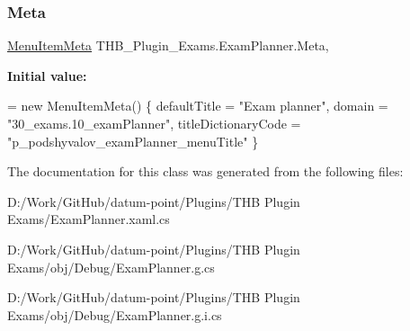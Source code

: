 \subsubsection{\texorpdfstring{Meta}{Meta}}
{\footnotesize\ttfamily \mbox{\hyperlink{class_uniform_client_1_1_plugins_1_1_menu_item_meta}{Menu\+Item\+Meta}} T\+H\+B\+\_\+\+Plugin\+\_\+\+Exams.\+Exam\+Planner.\+Meta\hspace{0.3cm}{\ttfamily [get]}, {\ttfamily [set]}}

{\bfseries Initial value\+:}
\begin{DoxyCode}
= \textcolor{keyword}{new} MenuItemMeta()
        \{
            defaultTitle = \textcolor{stringliteral}{"Exam planner"},
            domain = \textcolor{stringliteral}{"30\_exams.10\_examPlanner"},
            titleDictionaryCode = \textcolor{stringliteral}{"p\_podshyvalov\_examPlanner\_menuTitle"}
        \}
\end{DoxyCode}


The documentation for this class was generated from the following files\+:\begin{DoxyCompactItemize}
\item 
D\+:/\+Work/\+Git\+Hub/datum-\/point/\+Plugins/\+T\+H\+B Plugin Exams/Exam\+Planner.\+xaml.\+cs\item 
D\+:/\+Work/\+Git\+Hub/datum-\/point/\+Plugins/\+T\+H\+B Plugin Exams/obj/\+Debug/Exam\+Planner.\+g.\+cs\item 
D\+:/\+Work/\+Git\+Hub/datum-\/point/\+Plugins/\+T\+H\+B Plugin Exams/obj/\+Debug/Exam\+Planner.\+g.\+i.\+cs\end{DoxyCompactItemize}
